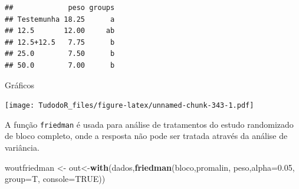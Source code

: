 \documentclass[
]{book}
\newenvironment{Shaded}{\begin{snugshade}}{\end{snugshade}}
\newcommand{\DataTypeTok}[1]{\textcolor[rgb]{0.13,0.29,0.53}{#1}}
\newcommand{\DecValTok}[1]{\textcolor[rgb]{0.00,0.00,0.81}{#1}}
\newcommand{\FloatTok}[1]{\textcolor[rgb]{0.00,0.00,0.81}{#1}}
\newcommand{\KeywordTok}[1]{\textcolor[rgb]{0.13,0.29,0.53}{\textbf{#1}}}
\newcommand{\NormalTok}[1]{#1}
\newcommand{\OperatorTok}[1]{\textcolor[rgb]{0.81,0.36,0.00}{\textbf{#1}}}
\newcommand{\OtherTok}[1]{\textcolor[rgb]{0.56,0.35,0.01}{#1}}
\newcommand{\StringTok}[1]{\textcolor[rgb]{0.31,0.60,0.02}{#1}}
\begin{document}
\begin{Shaded}
\end{Shaded}

\begin{verbatim}
##             peso groups
## Testemunha 18.25      a
## 12.5       12.00     ab
## 12.5+12.5   7.75      b
## 25.0        7.50      b
## 50.0        7.00      b
\end{verbatim}

Gráficos

\begin{Shaded}
\end{Shaded}

\texttt{[image: TudodoR\_files/figure-latex/unnamed-chunk-343-1.pdf]}

A função \texttt{friedman} é usada para análise de tratamentos do estudo randomizado
de bloco completo, onde a resposta não pode ser tratada através da análise de variância.

\begin{Shaded}
\begin{Highlighting}[]
\NormalTok{woutfriedman <-}\StringTok{ }\NormalTok{out<-}\KeywordTok{with}\NormalTok{(dados,}\KeywordTok{friedman}\NormalTok{(bloco,promalin, peso,}\DataTypeTok{alpha=}\FloatTok{0.05}\NormalTok{, }\DataTypeTok{group=}\NormalTok{T,}
  \DataTypeTok{console=}\OtherTok{TRUE}\NormalTok{))}
\end{Highlighting}
\end{Shaded}
\end{document}
